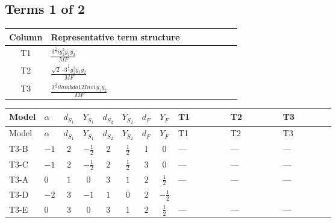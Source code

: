 \documentclass[8pt]{article}
\begin{document}
\begin{landscape}
\subsection*{Terms 1 of 2}
\begin{center}
\begin{tabular}{@{}c >{\raggedright\arraybackslash}p{0.82\linewidth}@{}}
\toprule
Column & Representative term structure \\
\midrule
T1 & \(\displaystyle \frac{3^{\frac{3}{4}} i g_{2}^{2} \overline{y_{1}} \overline{y_{2}}}{MF}\) \\
\midrule
T2 & \(\displaystyle \frac{\sqrt{2} \cdot 3^{\frac{3}{4}} g_{2}^{2} \overline{y_{1}} \overline{y_{2}}}{MF}\) \\
\midrule
T3 & \(\displaystyle \frac{3^{\frac{3}{4}} i lambda12Inv1 \overline{y_{1}} \overline{y_{2}}}{MF}\) \\
\midrule
\bottomrule
\end{tabular}
\end{center}
\smallskip
\tiny
\begin{longtable}{@{}llcccccc >{\raggedright\arraybackslash}p{0.21\linewidth} >{\raggedright\arraybackslash}p{0.21\linewidth} >{\raggedright\arraybackslash}p{0.21\linewidth}@{}}
\toprule
Model & $\alpha$ & $d_{S_1}$ & $Y_{S_1}$ & $d_{S_2}$ & $Y_{S_2}$ & $d_F$ & $Y_F$ & T1 & T2 & T3 \\
\midrule
\endfirsthead
\toprule
Model & $\alpha$ & $d_{S_1}$ & $Y_{S_1}$ & $d_{S_2}$ & $Y_{S_2}$ & $d_F$ & $Y_F$ & T1 & T2 & T3 \\
\midrule
\endhead
T3-B & $-1$ & $2$ & $-\frac{1}{2}$ & $2$ & $\frac{1}{2}$ & $1$ & $0$ & --- & --- & --- \\
\midrule
T3-C & $-1$ & $2$ & $-\frac{1}{2}$ & $2$ & $\frac{1}{2}$ & $3$ & $0$ & --- & --- & --- \\
\midrule
T3-A & $0$ & $1$ & $0$ & $3$ & $1$ & $2$ & $\frac{1}{2}$ & --- & --- & --- \\
\midrule
T3-D & $-2$ & $3$ & $-1$ & $1$ & $0$ & $2$ & $-\frac{1}{2}$ & \scriptsize\adjustbox{max width=\linewidth}{$\begin{gathered} - \frac{17 \cdot 3^{\frac{3}{4}} i g_{2}^{2} \overline{y_{1}} \overline{y_{2}}}{24 MF}\end{gathered}$} & \scriptsize\adjustbox{max width=\linewidth}{$\begin{gathered} - \frac{\sqrt{2} \cdot 3^{\frac{3}{4}} g_{2}^{2} \overline{y_{1}} \overline{y_{2}}}{3 MF}\end{gathered}$} & \scriptsize\adjustbox{max width=\linewidth}{$\begin{gathered} - \frac{3^{\frac{3}{4}} i lambda12Inv1 \overline{y_{1}} \overline{y_{2}}}{6 MF}\end{gathered}$} \\
\midrule
T3-E & $0$ & $3$ & $0$ & $3$ & $1$ & $2$ & $\frac{1}{2}$ & --- & --- & --- \\
\midrule
\bottomrule
\end{longtable}
\clearpage

\end{landscape}
\end{document}
